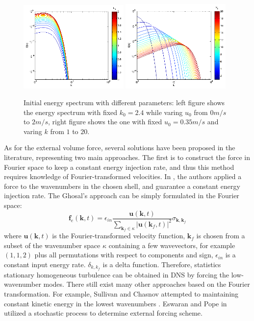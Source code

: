\begin{figure}[!htbp]\centering
\includegraphics[width=0.48\textwidth]{Figures/eng_spr_u}
\includegraphics[width=0.48\textwidth]{Figures/eng_spr_k}
\caption{Initial energy spectrum with different parameters: left figure shows the energy spectrum with fixed $k_0 = 2.4$ while varing $u_0$ from $0m/s$ to $2m/s$, right figure shows the one with fixed $u_0 = 0.35m/s$ and varing $k$ from $1$ to $20$.\label{fig:eng_spr}}
\end{figure}

As for the external volume force, several solutions have been proposed in the literature, representing two main approaches. The first is to construct the force in Fourier space to keep a constant energy injection rate, and thus this method requires knowledge of Fourier-transformed velocities. In \cite{Ghosal1995Dynamic, Carati1995Representation}, the authors applied a force to the wavenumbers in the chosen shell, and guarantee a constant energy injection rate. The Ghosal's approach can be simply formulated in the Fourier space: 
\begin{equation}
\mathbf{f}_e(\mathbf{k},t) = \epsilon_{in}\frac{\mathbf{u}(\mathbf{k},t)}
{\sum_{\mathbf{k}_f\in \kappa}|\mathbf{u}(\mathbf{k}_f,t)|^2}
\sigma_{\mathbf{k},\mathbf{k}_f}
\end{equation}
where $\mathbf{u}(\mathbf{k},t)$ is the Fourier-transformed velocity function, $\mathbf{k}_f$ is chosen from a subset of the wavenumber space $\kappa$ containing a few wavevectors, for example $(1,1,2)$ plus all permutations with respect to components and sign, $\epsilon_{in}$ is a constant input energy rate. $\delta_{k,k_f}$ is a delta function. Therefore, statistics stationary homogeneous turbulence can be obtained in DNS by forcing the low-wavenumber modes. There still exist many other approaches based on the Fourier transformation. For example, Sullivan and Chasnov attempted to maintaining constant kinetic energy in the lowest wavenumbers \cite{Sullivan1994Deterministic, Chasnov1991Simulation}. Eswaran and Pope in \cite{Eswaran1988} utilized a stochastic process to determine external forcing scheme. 

